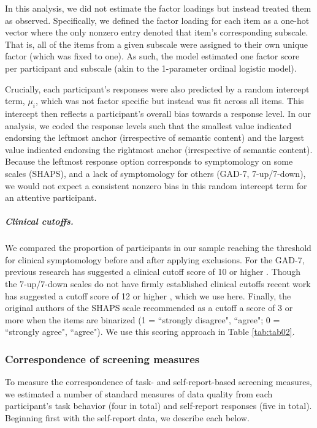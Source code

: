 \documentclass[a4paper,notitlepage,12pt]{article}
\begin{document}
In this analysis, we did not estimate the factor loadings but instead treated them as observed. Specifically, we defined the factor loading for each item as a one-hot vector where the only nonzero entry denoted that item's corresponding subscale. That is, all of the items from a given subscale were assigned to their own unique factor (which was fixed to one). As such, the model estimated one factor score per participant and subscale (akin to the 1-parameter ordinal logistic model).

Crucially, each participant's responses were also predicted by a random intercept term, $\mu_i$, which was not factor specific but instead was fit across all items. This intercept then reflects a participant's overall bias towards a response level. In our analysis, we coded the response levels such that the smallest value indicated endorsing the leftmost anchor (irrespective of semantic content) and the largest value indicated endorsing the rightmost anchor (irrespective of semantic content). Because the leftmost response option corresponds to symptomology on some scales (SHAPS), and a lack of symptomology for others (GAD-7, 7-up/7-down), we would not expect a consistent nonzero bias in this random intercept term for an attentive participant. 

\subparagraph{Clinical cutoffs.} We compared the proportion of participants in our sample reaching the threshold for clinical symptomology before and after applying exclusions. For the GAD-7, previous research has suggested a clinical cutoff score of 10 or higher \cite{lowe2008validation, hinz2017psychometric}. Though the 7-up/7-down scales do not have firmly established clinical cutoffs recent work has suggested a cutoff score of 12 or higher \cite{youngstrom2020evaluating}, which we use here. Finally, the original authors of the SHAPS scale recommended as a cutoff a score of 3 or more when the items are binarized (1 = ``strongly disagree", ``agree"; 0 = ``strongly agree", ``agree"). We use this scoring approach in Table \ref{tab:tab02}.   

\subsubsection*{Correspondence of screening measures}

To measure the correspondence of task- and self-report-based screening measures, we estimated a number of standard measures of data quality from each participant's task behavior (four in total) and self-report responses (five in total). Beginning first with the self-report data, we describe each below.
\end{document}
